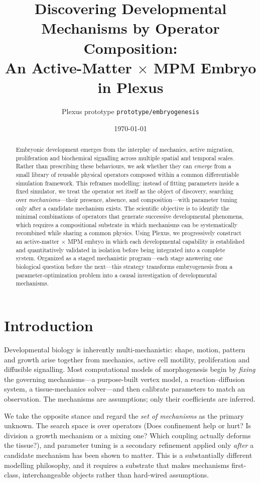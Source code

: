 \documentclass[11pt]{article}
\title{\textbf{Discovering Developmental Mechanisms by Operator Composition:\\[2pt]
An Active-Matter $\times$ MPM Embryo in Plexus}}
\author{Plexus prototype \texttt{prototype/embryogenesis}}
\date{\today}
\begin{document}
\maketitle

\begin{abstract}
Embryonic development emerges from the interplay of mechanics, active migration, proliferation and
biochemical signalling across multiple spatial and temporal scales. Rather than prescribing these
behaviours, we ask whether they can \emph{emerge} from a small library of reusable physical operators
composed within a common differentiable simulation framework. This reframes modelling: instead of
fitting parameters inside a fixed simulator, we treat the operator set itself as the object of
discovery, searching over \emph{mechanisms}---their presence, absence, and composition---with parameter
tuning only after a candidate mechanism exists. The scientific objective is to identify the minimal
combinations of operators that generate successive developmental phenomena, which requires a
compositional substrate in which mechanisms can be systematically recombined while sharing a common
physics. Using Plexus, we progressively construct an active-matter $\times$ MPM embryo in which each
developmental capability is established and quantitatively validated in isolation before being
integrated into a complete system. Organized as a staged mechanistic program---each stage answering one
biological question before the next---this strategy transforms embryogenesis from a
parameter-optimization problem into a causal investigation of developmental mechanisms.
\end{abstract}

\section{Introduction}
Developmental biology is inherently multi-mechanistic: shape, motion, pattern and growth arise together
from mechanics, active cell motility, proliferation and diffusible signalling. Most computational models
of morphogenesis begin by \emph{fixing} the governing mechanisms---a purpose-built vertex model, a
reaction--diffusion system, a tissue-mechanics solver---and then calibrate parameters to match an
observation. The mechanisms are assumptions; only their coefficients are inferred.

We take the opposite stance and regard the \emph{set of mechanisms} as the primary unknown. The search
space is over operators (Does confinement help or hurt? Is division a growth mechanism or a mixing one?
Which coupling actually deforms the tissue?), and parameter tuning is a secondary refinement applied
only \emph{after} a candidate mechanism has been shown to matter. This is a substantially different
modelling philosophy, and it requires a substrate that makes mechanisms first-class, interchangeable
objects rather than hard-wired assumptions.
\end{document}
